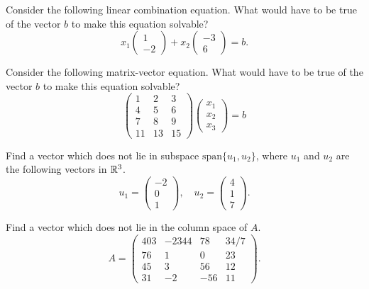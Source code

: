 \documentclass[elementsmain.tex]{subfiles}
\begin{document}
\begin{exercise}
Consider the following linear combination equation. What would have to be true of the vector $b$ to make this equation solvable?
\[
x_1 \begin{pmatrix} 1 \\ -2 \end{pmatrix} + x_2 \begin{pmatrix} -3 \\ 6\end{pmatrix} = b.
\]
\end{exercise}

\begin{exercise}
Consider the following matrix-vector equation. What would have to be true of the vector $b$ to make this equation solvable?
\begin{equation*}
\begin{pmatrix} 1 & 2 & 3 \\ 4 & 5 & 6 \\ 7 & 8 & 9 \\ 11 & 13 & 15  \end{pmatrix} \begin{pmatrix} x_1 \\ x_2 \\x_3 \end{pmatrix} = b
\end{equation*}
\end{exercise}


\begin{exercise}
Find a vector which does not lie in subspace $\mathrm{span}\{u_1,u_2\}$, where $u_1$ and $u_2$ are the following vectors in $\mathbb{R}^3$.
\[
u_1 = \begin{pmatrix} -2\\ 0 \\ 1 \end{pmatrix} , \quad u_2 =\begin{pmatrix} 4 \\ 1 \\ 7 \end{pmatrix}.
\]
\end{exercise}


\begin{exercise}
Find a vector which does not lie in the column space of $A$. 
\[
A = \begin{pmatrix}
403 & -2344 & 78 & 34/7 \\ 76 & 1 & 0 & 23 \\ 45 & 3 & 56 & 12 \\
31 & -2 & -56 & 11
\end{pmatrix}.
\]
\end{exercise}




\clearpage
\end{document}

